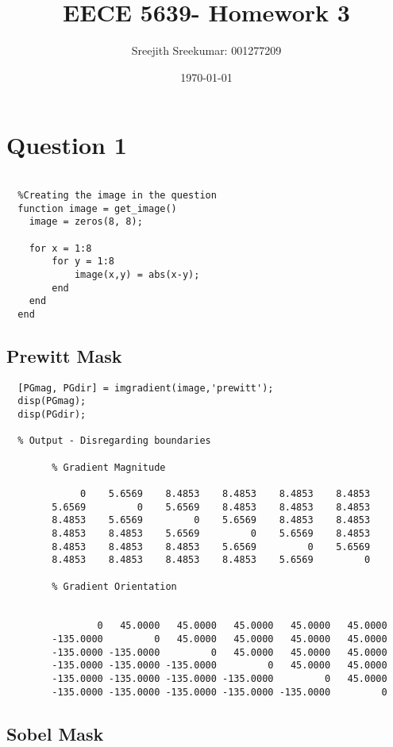 \documentclass{article}
\title{EECE 5639- Homework 3}
\author{Sreejith Sreekumar: 001277209}
\date{\today}
\begin{document}
\maketitle

\section{Question 1}

\begin{verbatim}

  %Creating the image in the question
  function image = get_image()
    image = zeros(8, 8);
    
    for x = 1:8
        for y = 1:8
            image(x,y) = abs(x-y);
        end
    end
  end
\end{verbatim}

\subsection{Prewitt Mask}
\begin{verbatim}
  [PGmag, PGdir] = imgradient(image,'prewitt');
  disp(PGmag);
  disp(PGdir);

  % Output - Disregarding boundaries

        % Gradient Magnitude
  
             0    5.6569    8.4853    8.4853    8.4853    8.4853    
        5.6569         0    5.6569    8.4853    8.4853    8.4853    
        8.4853    5.6569         0    5.6569    8.4853    8.4853    
        8.4853    8.4853    5.6569         0    5.6569    8.4853    
        8.4853    8.4853    8.4853    5.6569         0    5.6569    
        8.4853    8.4853    8.4853    8.4853    5.6569         0   

        % Gradient Orientation


                0   45.0000   45.0000   45.0000   45.0000   45.0000   
        -135.0000         0   45.0000   45.0000   45.0000   45.0000   
        -135.0000 -135.0000         0   45.0000   45.0000   45.0000   
        -135.0000 -135.0000 -135.0000         0   45.0000   45.0000   
        -135.0000 -135.0000 -135.0000 -135.0000         0   45.0000   
        -135.0000 -135.0000 -135.0000 -135.0000 -135.0000         0   
\end{verbatim}

\pagebreak

\subsection{Sobel Mask}
\end{document}
